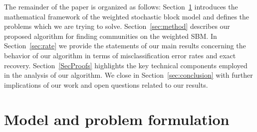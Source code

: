 \documentclass{article}
\begin{document}



The remainder of the paper is organized as follows: Section~\ref{sec:formulation} introduces the mathematical framework of the weighted stochastic block model and defines the problems which we are trying to solve. Section~\ref{sec:method} describes our proposed algorithm for finding communities on the weighted SBM. In Section~\ref{sec:rate} we provide the statements of our main results concerning the behavior of our algorithm in terms of misclassification error rates and exact recovery. Section~\ref{SecProofs} highlights the key technical components employed in the analysis of our algorithm. We close in Section~\ref{sec:conclusion} with further implications of our work and open questions related to our results. %




\section{Model and problem formulation}
\label{sec:formulation}
\end{document}
